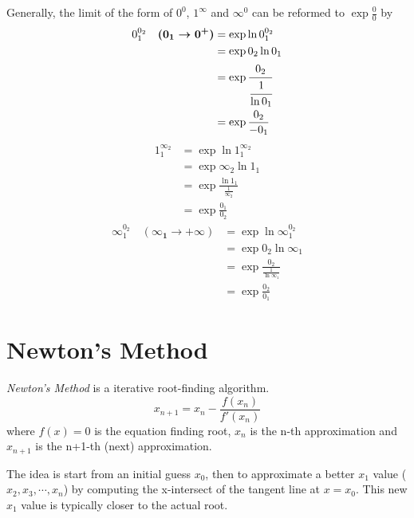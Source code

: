 \documentclass{note}
\begin{document}
Generally, the limit of the form of $0^0$, $1^\infty$ and $\infty^0$ can be reformed to $\exp \frac{0}{0}$ by
\begin{align*}
  0_1^{0_2} \quad\boldsymbol{(0_1 \to 0^+)}
    & = \exp\ln 0_1^{0_2}                   \\
    & = \exp0_2 \ln 0_1                     \\
    & = \exp\cfrac{0_2}{\cfrac{1}{\ln 0_1}} \\
    & = \exp\frac{0_2}{-0_1}
\end{align*}
\begin{align*}
  1_1^{\infty_2}
    & = \exp\ln 1_1^{\infty_2}                 \\
    & = \exp\infty_2 \ln 1_1                   \\
    & = \exp\frac{\ln 1_1}{\frac{1}{\infty_2}} \\
    & = \exp\frac{0_1}{0_2}
\end{align*}
\begin{align*}
  \infty_1^{0_2} \quad\boldsymbol{(\infty_1 \to +\infty)}
    & = \exp\ln \infty_1^{0_2}                 \\
    & = \exp0_2 \ln \infty_1                   \\
    & = \exp\frac{0_2}{\frac{1}{\ln \infty_1}} \\
    & = \exp\frac{0_2}{0_1}
\end{align*}

\section{Newton's Method}

\textit{Newton's Method} is a iterative root-finding algorithm.
\[
  x_{n+1} = x_n - \frac{f(x_n)}{f'(x_n)}
\]
where $f(x) = 0$ is the equation finding root, $x_n$ is the n-th approximation and $x_{n+1}$ is the n+1-th (next) approximation.

The idea is start from an initial guess $x_0$, then to approximate a better $x_1$ value ($x_2, x_3, \cdots, x_n$) by computing the x-intersect of the tangent line at $x=x_0$. This new $x_1$ value is typically closer to the actual root.
\end{document}
